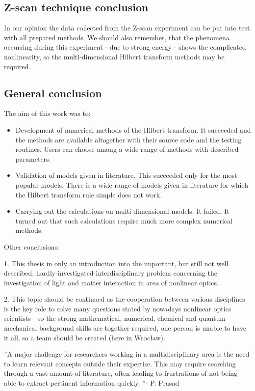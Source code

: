 \documentclass[12pt,twoside,a4paper]{article}
\numberwithin{equation}{subsection}
\numberwithin{figure}{subsection}
\begin{document}
\subsection{Z-scan technique conclusion} \label{chap:conclusion_zscan}

In our opinion the data collected from the Z-scan experiment can be put into test with all prepared methods. We should also remember, that the phenomena occurring during this experiment - due to strong energy - shows the complicated nonlinearity, so the multi-dimensional Hilbert transform methods may be required. 

\subsection{General conclusion} \label{chap:conclusion_general}

The aim of this work was to:

\begin{itemize} 
	\item Development of numerical methods of the Hilbert transform. It succeeded and the methods are available altogether with their source code and the testing routines. Users can choose among a wide range of methods with described parameters.
	\item Validation of models given in literature. This succeeded only for the most popular models. There is a wide range of models given in literature for which the Hilbert transform rule simple does not work.
	\item Carrying out the calculations on multi-dimensional models. It failed. It turned out that such calculations require much more complex numerical methods.
\end{itemize}

Other conclusions:

1. This thesis in only an introduction into the important, but still not well described, hardly-investigated interdisciplinary problem concerning the investigation of light and matter interaction in area of nonlinear optics. 

2. This topic should be continued as the cooperation between various disciplines is the key role to solve many questions stated by nowadays nonlinear optics scientists - so the strong mathematical, numerical, chemical and quantum-mechanical background skills are together required, one person is unable to have it all, so a team should be created (here in Wrocław).

''A major challenge for researchers working in a multidisciplinary area is the need to learn relevant concepts outside their expertise. This may require searching through a vast amount of literature, often leading to frustrations of not being able to extract pertinent information quickly. ''- P. Prasad \cite{prasad_nanophotonics}
\end{document}
